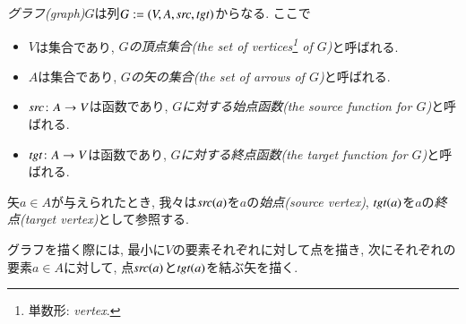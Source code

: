\begin{definition}\label{def:graph}


\emph{グラフ(graph)}$G$は列$G:=(V,A,\operatorname{\mathit{src}},\operatorname{\mathit{tgt}})$からなる. ここで
\begin{itemize}
\item $V$は集合であり, \emph{$G$の頂点集合(the set of vertices\footnote{単数形: \emph{vertex}.} of $G$)}と呼ばれる.
\item $A$は集合であり, \emph{$G$の矢の集合(the set of arrows of $G$)}と呼ばれる.
\item $\operatorname{\mathit{src}}\colon A\rightarrow V$は函数であり, \emph{$G$に対する始点函数(the source function for $G$)}と呼ばれる.
\item $\operatorname{\mathit{tgt}}\colon A\rightarrow V$は函数であり, \emph{$G$に対する終点函数(the target function for $G$)}と呼ばれる.
\end{itemize}
矢$a\in A$が与えられたとき, 我々は$\operatorname{\mathit{src}}(a)$を$a$の\emph{始点(source vertex)}, $\operatorname{\mathit{tgt}}(a)$を$a$の\emph{終点(target vertex)}として参照する.

\end{definition}


グラフを描く際には, 最小に$V$の要素それぞれに対して点を描き, 次にそれぞれの要素$a\in A$に対して, 点$\operatorname{\mathit{src}}(a)$と$\operatorname{\mathit{tgt}}(a)$を結ぶ矢を描く.

